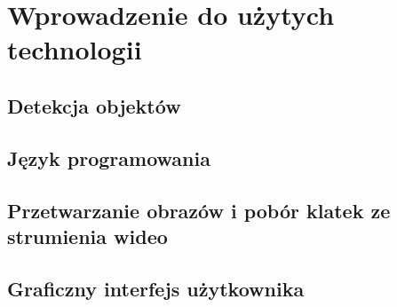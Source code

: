 \chapter{Wprowadzenie do użytych technologii}
\label{chap:technologie}

\section{Detekcja objektów}


\section{Język programowania}


\section{Przetwarzanie obrazów i pobór klatek ze strumienia wideo}


\section{Graficzny interfejs użytkownika}
